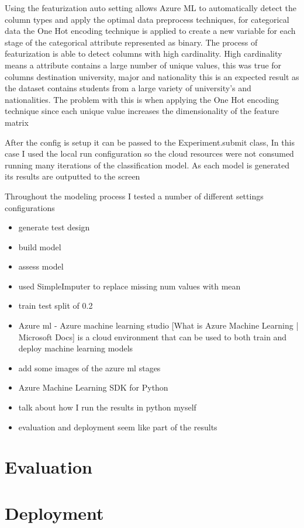 Using the featurization auto setting allows Azure ML to automatically detect the column types and apply the optimal data preprocess techniques, for categorical data the One Hot encoding technique is applied to create a new variable for each stage of the categorical attribute represented as binary. The process of featurization is able to detect columns with high cardinality.  High cardinality means a attribute contains a large number of unique values, this was true for columns destination university, major and nationality this is an expected result as the dataset contains students from a large variety of university's and nationalities. The problem with this is when applying the One Hot encoding technique since each unique value increases the dimensionality of the feature matrix 

After the config is setup it can be passed to the Experiment.submit class, In this case I used the local run configuration so the cloud resources were not consumed running many iterations of the classification model. As each model is generated its results are outputted to the screen

Throughout the modeling process I tested a number of different settings configurations   


\begin{itemize}
\item generate test design
\item build model 
\item assess model
\end{itemize}



\begin{itemize}
\item used SimpleImputer to replace missing num values with mean
\item train test split of 0.2
\item Azure ml - Azure machine learning studio [What is Azure Machine Learning | Microsoft Docs] is a cloud environment that can be used to both train and deploy machine learning models 
\item add some images of the azure ml stages
\item Azure Machine Learning SDK for Python
\item talk about how I run the results in python myself
\end{itemize}




\begin{itemize}
\item evaluation and deployment seem like part of the results
\end{itemize}

\section{Evaluation}

\section{Deployment}


